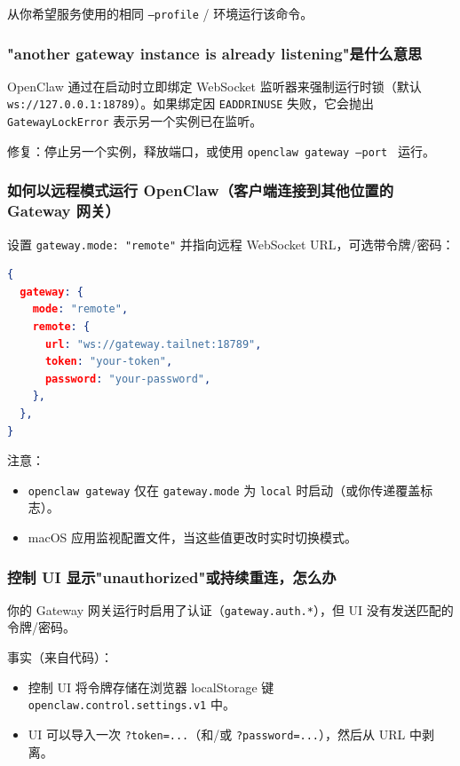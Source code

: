 从你希望服务使用的相同 \texttt{--profile} / 环境运行该命令。

\subsubsection{"another gateway instance is already listening"是什么意思}


OpenClaw 通过在启动时立即绑定 WebSocket 监听器来强制运行时锁（默认 \texttt{ws://127.0.0.1:18789}）。如果绑定因 \texttt{EADDRINUSE} 失败，它会抛出 \texttt{GatewayLockError} 表示另一个实例已在监听。

修复：停止另一个实例，释放端口，或使用 \texttt{openclaw gateway --port } 运行。

\subsubsection{如何以远程模式运行 OpenClaw（客户端连接到其他位置的 Gateway 网关）}


设置 \texttt{gateway.mode: "remote"} 并指向远程 WebSocket URL，可选带令牌/密码：

\begin{lstlisting}[language=json]
{
  gateway: {
    mode: "remote",
    remote: {
      url: "ws://gateway.tailnet:18789",
      token: "your-token",
      password: "your-password",
    },
  },
}
\end{lstlisting}


注意：

\begin{itemize}
  \item \texttt{openclaw gateway} 仅在 \texttt{gateway.mode} 为 \texttt{local} 时启动（或你传递覆盖标志）。
  \item macOS 应用监视配置文件，当这些值更改时实时切换模式。
\end{itemize}


\subsubsection{控制 UI 显示"unauthorized"或持续重连，怎么办}


你的 Gateway 网关运行时启用了认证（\texttt{gateway.auth.*}），但 UI 没有发送匹配的令牌/密码。

事实（来自代码）：

\begin{itemize}
  \item 控制 UI 将令牌存储在浏览器 localStorage 键 \texttt{openclaw.control.settings.v1} 中。
  \item UI 可以导入一次 \texttt{?token=...}（和/或 \texttt{?password=...}），然后从 URL 中剥离。
\end{itemize}


